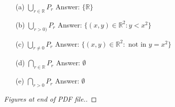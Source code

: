 \documentclass[12pt,oneside]{article}
\newcommand{\R}{\mathbb{R}}
\begin{document}
\begin{itemize}
    \item[(a)] $\bigcup_{r \in \R} P_r$
    \subitem Answer: $\{\R\}$
    \item[(b)] $\bigcup_{r > 0)} P_r$
    \subitem Answer: $\{(x,y) \in \R^2: y < x^2\}$
    \item[(c)] $\bigcup_{r \neq 0} P_r$
    \subitem Answer: $\{(x,y) \in \R^2: \text{ not in } y = x^2\}$
    \item[(d)] $\bigcap_{r \in \R} P_r$
    \subitem Answer: $\emptyset$
    \item[(e)] $\bigcap_{r > 0} P_r$
    \subitem Answer: $\emptyset$
    
\end{itemize}

\begin{proof}[Figures at end of PDF file.]

\end{proof}




\end{document}
